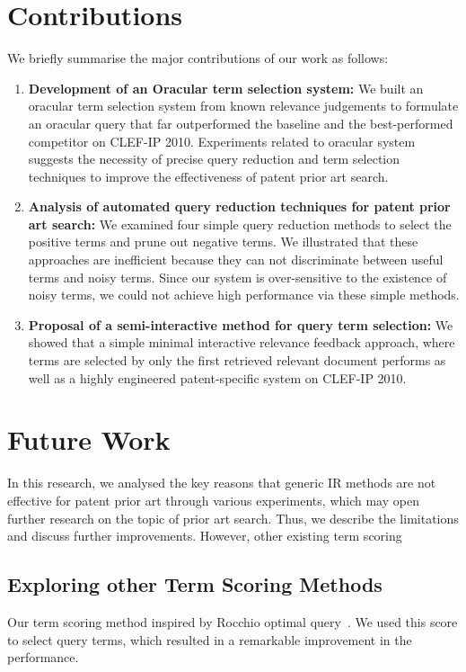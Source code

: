 \section{Contributions}
\label{sec:contributions}
We briefly summarise the major contributions of our work as follows:
\begin{enumerate}
\item \textbf{Development of an Oracular term selection system: }We built an oracular term selection system from known relevance judgements to formulate an oracular query that far outperformed the baseline and the best-performed competitor on CLEF-IP 2010. 
Experiments related to oracular system suggests the necessity of precise query
reduction and term selection techniques to improve the effectiveness of patent
prior art search.
\item \textbf{Analysis of automated query reduction techniques for patent prior art search: } We examined four simple query reduction methods to select the positive terms and prune out negative terms. We illustrated that these approaches are inefficient because they can not discriminate between useful terms and noisy terms. Since our system is over-sensitive to the existence of noisy terms, we could not achieve high performance via these simple methods. 
\item \textbf{Proposal of a semi-interactive method for query term selection: }We showed that a simple minimal interactive relevance feedback approach, where terms are selected by only the first retrieved relevant document performs as well as a highly engineered patent-specific system on CLEF-IP 2010. 
\end{enumerate}

\section{Future Work}
\label{sec:future}
In this research, we analysed the key reasons that generic IR methods are not effective for patent prior art through various experiments, which may open further research on the topic of prior art search. Thus, we describe the limitations and discuss further improvements. However, other existing term scoring 
\subsection{Exploring other Term Scoring Methods}
\label{subsec:ExploringTermScoringMethods}
Our term scoring method inspired by Rocchio optimal query~\citep{manning2008introduction}. We used this score to select query terms, which resulted in a remarkable improvement in the performance. 
